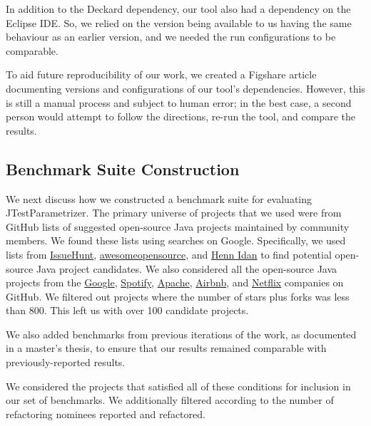 In addition to the Deckard dependency, our tool also had a dependency on the Eclipse IDE. So, we relied on the version being available to us having the same behaviour as an earlier version, and we needed the run configurations to be comparable.

To aid future reproducibility of our work, we created a Figshare article documenting versions and configurations of our tool's dependencies. However, this is still a manual process and subject to human error; in the best case, a second person would attempt to follow the directions, re-run the tool, and compare the results.

\subsection{Benchmark Suite Construction}

We next discuss how we constructed a benchmark suite for evaluating JTestParametrizer. The primary universe of projects that we used were from GitHub lists of suggested open-source Java projects maintained by community members. We found these lists using searches on Google. Specifically, we used lists from \href{https://medium.com/issuehunt/50-top-java-projects-on-github-adbfe9f67dbc}{IssueHunt}, \href{https://awesomeopensource.com/projects/maven-plugin}{awesomeopensource}, and \href{https://www.overops.com/blog/the-hitchhikers-guide-to-github-13-java-projects-you-should-try/}{Henn Idan} to find potential open-source Java project candidates. 
We also considered all the open-source Java projects from the \href{https://github.com/google/?q=&type=&language=java&sort=stargazers}{Google}, \href{https://github.com/spotify/?q=&type=&language=java&sort=stargazers}{Spotify}, \href{https://github.com/apache/?q=&type=&language=java&sort=stargazers}{Apache}, \href{https://github.com/airbnb/?q=&type=&language=java&sort=stargazers}{Airbnb}, and \href{https://github.com/Netflix?q=&type=&language=java&sort=stargazers}{Netflix} companies on GitHub. We filtered out projects where the number of stars plus forks was less than 800. This left us with over 100 candidate projects.

We also added benchmarks from previous iterations of the work, as documented in a master's thesis, to ensure that our results remained comparable with previously-reported results.

We considered the projects that satisfied all of these conditions for inclusion in our set of benchmarks. We additionally filtered according to the number of refactoring nominees reported and refactored.

